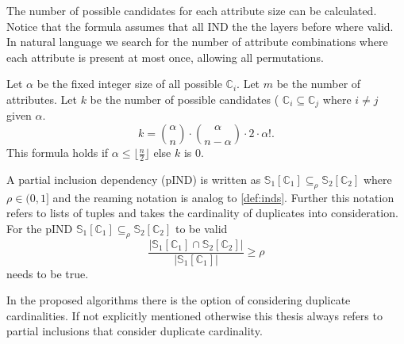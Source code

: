 The number of possible candidates for each attribute size can be calculated. Notice that the formula assumes that all IND the the layers before where valid. In natural language we search for the number of attribute combinations where each attribute is present at most once, allowing all permutations.
\begin{definition}\label{def:candidates}
    Let $\alpha$ be the fixed integer size of all possible $\mathbb{C}_i$. Let $m$ be the number of attributes. Let $k$ be the number of possible candidates ( $\mathbb{C}_i \subseteq \mathbb{C}_j$ where $i \not = j$ given $\alpha$.
    $$
        k = \binom{\alpha}{n} \cdot \binom{\alpha}{n-\alpha} \cdot 2 \cdot \alpha!.
    $$
    This formula holds if $\alpha \leq \lfloor \frac{n}{2} \rfloor$ else $k$ is $0$.
\end{definition}

\begin{definition}\label{def:pinds}
    A partial inclusion dependency (pIND) is written as $\mathbb{S}_1[\mathbb{C}_1] \subseteq_{\rho} \mathbb{S}_2[\mathbb{C}_2]$ where $\rho \in (0, 1]$ and the reaming notation is analog to \ref{def:inds}. Further this notation refers to lists of tuples and takes the cardinality of duplicates into consideration. For the pIND $\mathbb{S}_1[\mathbb{C}_1] \subseteq_{\rho} \mathbb{S}_2[\mathbb{C}_2]$ to be valid
    $$
        \frac{|\mathbb{S}_1[\mathbb{C}_1] \cap \mathbb{S}_2[\mathbb{C}_2]|}
            {|\mathbb{S}_1[\mathbb{C}_1]|} \geq \rho
    $$
    needs to be true.
\end{definition}

In the proposed algorithms there is the option of considering duplicate cardinalities. If not explicitly mentioned otherwise this thesis always refers to partial inclusions that consider duplicate cardinality.

